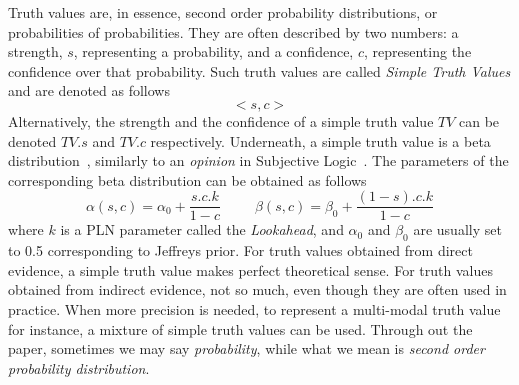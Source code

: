 \documentclass[runningheads]{llncs}
\newcommand{\TEval}{\textit{Evaluation}}
\newcommand{\TLamb}{\textit{Lambda}}
\newcommand{\TAnd}{\textit{And}}
\newcommand{\TOr}{\textit{Or}}
\newcommand{\TNot}{\textit{Not}}
\newcommand{\TImpl}{\textit{Implication}}
\newcommand{\TTV}{\textit{TV}}
\begin{document}
Truth values are, in essence, second order probability distributions,
or probabilities of probabilities.  They are often described by two
numbers: a strength, $s$, representing a probability, and a
confidence, $c$, representing the confidence over that probability.
Such truth values are called \emph{Simple Truth Values} and are
denoted as follows
$$<\!s, c\!>$$
Alternatively, the strength and the confidence of a simple truth value
$\TTV$ can be denoted $\TTV.s$ and $\TTV.c$ respectively.  Underneath,
a simple truth value is a beta distribution~\cite{Abourizk94Fitting},
similarly to an \emph{opinion} in Subjective Logic~\cite{Josang2026}.
The parameters of the corresponding beta distribution can be obtained
as follows
$$\alpha(s, c)=\alpha_0 + \frac{s.c.k}{1-c}\ \ \ \ \ \ \ \ \ \ \
\beta(s, c)=\beta_0 + \frac{(1-s).c.k}{1-c}$$ where $k$ is a PLN
parameter called the \emph{Lookahead}, and $\alpha_0$ and $\beta_0$
are usually set to 0.5 corresponding to Jeffreys prior.  For truth
values obtained from direct evidence, a simple truth value makes
perfect theoretical sense.  For truth values obtained from indirect
evidence, not so much, even though they are often used in practice.
When more precision is needed, to represent a multi-modal truth value
for instance, a mixture of simple truth values can be used.  Through
out the paper, sometimes we may say \emph{probability}, while what we
mean is \emph{second order probability distribution}.


\end{document}
